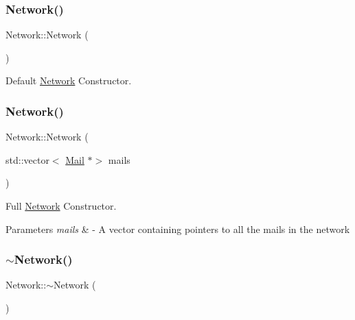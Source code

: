 \subsubsection{\texorpdfstring{Network()}{Network()}\hspace{0.1cm}{\footnotesize\ttfamily [1/2]}}
{\footnotesize\ttfamily Network\+::\+Network (\begin{DoxyParamCaption}{ }\end{DoxyParamCaption})}



Default \hyperlink{classNetwork}{Network} Constructor. 

\mbox{\label{classNetwork_a6c20a000b0a40b33b39b26874a4d50dd}} 
\subsubsection{\texorpdfstring{Network()}{Network()}\hspace{0.1cm}{\footnotesize\ttfamily [2/2]}}
{\footnotesize\ttfamily Network\+::\+Network (\begin{DoxyParamCaption}\item[{std\+::vector$<$ \hyperlink{classMail}{Mail} $\ast$$>$}]{mails }\end{DoxyParamCaption})}



Full \hyperlink{classNetwork}{Network} Constructor. 


\begin{DoxyParams}{Parameters}
{\em mails} & -\/ A vector containing pointers to all the mails in the network \\
\hline
\end{DoxyParams}
\mbox{\label{classNetwork_a7a4e19cdb4bf0c7ecf82baa643831492}} 
\subsubsection{\texorpdfstring{$\sim$\+Network()}{~Network()}}
{\footnotesize\ttfamily Network\+::$\sim$\+Network (\begin{DoxyParamCaption}{ }\end{DoxyParamCaption})\hspace{0.3cm}{\ttfamily [virtual]}}



